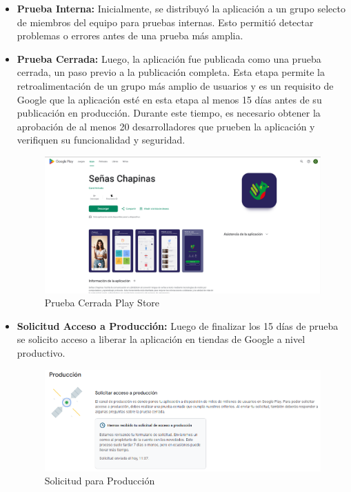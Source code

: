 \begin{itemize}
    \item \textbf{Prueba Interna:} Inicialmente, se distribuyó la aplicación a un grupo selecto de miembros del equipo para pruebas internas. Esto permitió detectar problemas o errores antes de una prueba más amplia.
    \item \textbf{Prueba Cerrada:} Luego, la aplicación fue publicada como una prueba cerrada, un paso previo a la publicación completa. Esta etapa permite la retroalimentación de un grupo más amplio de usuarios y es un requisito de Google que la aplicación esté en esta etapa al menos 15 días antes de su publicación en producción. Durante este tiempo, es necesario obtener la aprobación de al menos 20 desarrolladores que prueben la aplicación y verifiquen su funcionalidad y seguridad.
    
        \begin{figure} [H]
            \centering
            \includegraphics[width=0.9\linewidth]{figuras/prueba_cerrada.png}
            \caption{Prueba Cerrada Play Store}
            \label{fig:enter-label}
        \end{figure}

   \item \textbf{Solicitud Acceso a Producción:} Luego de finalizar los 15 días de prueba se solicito acceso a liberar la aplicación en tiendas de Google a nivel productivo. 

   \begin{figure} [H]
       \centering
       \includegraphics[width=0.9\linewidth]{figuras/solicitud_produccion.png}
       \caption{Solicitud para Producción}
       \label{fig:enter-label}
   \end{figure}
   
\end{itemize}



